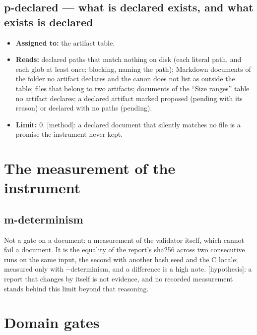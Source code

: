 \documentclass[
  american,
  10pt,
]{report}
\providecommand{\tightlist}{%
  \setlength{\itemsep}{0pt}\setlength{\parskip}{0pt}}
\renewcommand{\texttt}[1]{{\ttfamily\hyphenchar\font=-1 #1}}
\begin{document}
\subsection{\texorpdfstring{\texttt{p-\allowbreak{}declared} --- what is
declared exists, and what exists is
declared}{ --- what is declared exists, and what exists is declared}}\label{p-declared-what-is-declared-exists-and-what-exists-is-declared}

\begin{itemize}
\tightlist
\item
  \textbf{Assigned to:} the artifact table.
\item
  \textbf{Reads:} declared paths that match nothing on disk (each
  literal path, and each glob at least once; blocking, naming the path);
  Markdown documents of the folder no artifact declares and the canon
  does not list as outside the table; files that belong to two
  artifacts; documents of the ``Size ranges'' table no artifact
  declares; a declared artifact marked \texttt{proposed} (pending with
  its reason) or declared with no paths (pending).
\item
  \textbf{Limit:} 0. \texttt{[method]}: a declared document that
  silently matches no file is a promise the instrument never kept.
\end{itemize}

\section{The measurement of the
instrument}\label{the-measurement-of-the-instrument}

\subsection{\texorpdfstring{\texttt{m-\allowbreak{}determinism}}{}}\label{m-determinism}

Not a gate on a document: a measurement of the validator itself, which
cannot fail a document. It is the equality of the report's sha256 across
two consecutive runs on the same input, the second with another hash
seed and the C locale; measured only with
\texttt{-\allowbreak{}-\allowbreak{}determinism}, and a difference is a
high note. \texttt{[hypothesis]}: a report that changes by itself is not
evidence, and no recorded measurement stands behind this limit beyond
that reasoning.

\section{Domain gates}\label{domain-gates}
\end{document}
